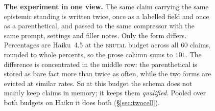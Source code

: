 \documentclass[11pt]{article}
\begin{document}
\begin{figure}[t]
{}
\caption{\textbf{The experiment in one view.} The same claim carrying the same epistemic
standing is written twice, once as a labelled field and once as a parenthetical, and
passed to the same compressor with the same prompt, settings and filler notes. Only the
form differs. Percentages are Haiku~4.5 at the \textsc{brutal} budget across all $60$
claims, rounded to whole percents, so the prose column sums to $101$. The difference is concentrated in the middle row: the parenthetical is stored as
bare fact more than twice as often, while the two forms are evicted at similar rates. So
at this budget the schema does not mainly keep claims in memory; it keeps them
\emph{qualified}. Pooled over both budgets on Haiku it does both (\S\ref{sec:twocell}).}
\label{fig:teaser}
\end{figure}
\end{document}
